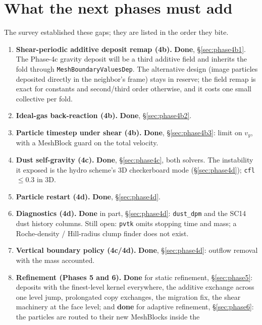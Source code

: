 \documentclass[11pt]{article}
\newcommand{\code}[1]{\texttt{#1}}
\begin{document}
\section{What the next phases must add}
\label{sec:next}

The survey established these gaps; they are listed in the order they bite.

\begin{enumerate}\itemsep4pt
\item \textbf{Shear-periodic additive deposit remap (4b).} \textbf{Done},
      \S\ref{sec:phase4b1}. The Phase-4c gravity deposit will be a third additive field
      and inherits the fold through \code{MeshBoundaryValuesDep}. The alternative
      design (image particles deposited directly in the neighbor's frame) stays in
      reserve; the field remap is exact for constants and second/third order otherwise,
      and it costs one small collective per fold.
\item \textbf{Ideal-gas back-reaction (4b).} \textbf{Done}, \S\ref{sec:phase4b2}.
\item \textbf{Particle timestep under shear (4b).} \textbf{Done},
      \S\ref{sec:phase4b3}: limit on $v_y$, with a MeshBlock guard on the total
      velocity.
\item \textbf{Dust self-gravity (4c).} \textbf{Done}, \S\ref{sec:phase4c}, both
      solvers. The instability it exposed is the hydro scheme's 3D checkerboard mode
      (\S\ref{sec:phase4d}); \code{cfl} $\le 0.3$ in 3D.
\item \textbf{Particle restart (4d).} \textbf{Done}, \S\ref{sec:phase4d}.
\item \textbf{Diagnostics (4d).} \textbf{Done} in part, \S\ref{sec:phase4d}:
      \code{dust\_dpm} and the SC14 dust history columns. Still open: \code{pvtk} omits
      stopping time and mass; a Roche-density / Hill-radius clump finder does not exist.
\item \textbf{Vertical boundary policy (4c/4d).} \textbf{Done}, \S\ref{sec:phase4d}:
      outflow removal with the mass accounted.
\item \textbf{Refinement (Phases 5 and 6).} \textbf{Done} for static refinement,
      \S\ref{sec:phase5}: deposits with the finest-level kernel everywhere, the additive
      exchange across one level jump, prolongated copy exchanges, the migration fix, the
      shear machinery at the face level; and \textbf{done} for adaptive refinement,
      \S\ref{sec:phase6}: the particles are routed to their new MeshBlocks inside the

\end{enumerate}
\end{document}
